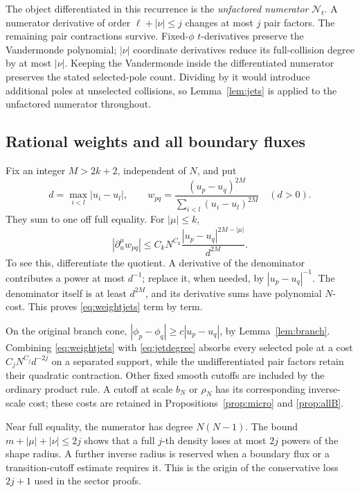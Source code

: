 \documentclass[11pt]{article}
\numberwithin{equation}{section}
\theoremstyle{definition}
\begin{document}
The object differentiated in this recurrence is the
\emph{unfactored numerator} \(\mathscr N_t\).
A numerator derivative of order \(\ell+|\nu|\le j\) changes at
most \(j\) pair factors. The remaining pair contractions survive.
Fixed-\(\phi\) \(t\)-derivatives preserve the Vandermonde polynomial;
\(|\nu|\) coordinate derivatives reduce its full-collision degree
by at most \(|\nu|\).
Keeping the Vandermonde inside the differentiated numerator preserves
the stated selected-pole count. Dividing by it would introduce additional
poles at unselected collisions, so Lemma~\ref{lem:jets} is applied
to the unfactored numerator throughout.

\subsection{Rational weights and all boundary fluxes}
Fix an integer \(M>2k+2\), independent of \(N\), and put
\[
 d=\max_{i<l}|u_i-u_l|,\qquad
 w_{pq}=\frac{(u_p-u_q)^{2M}}
                  {\sum_{i<l}(u_i-u_l)^{2M}}\quad(d>0).
\]
They sum to one off full equality. For \(|\mu|\le k\),
\begin{equation}
 |\partial_u^\mu w_{pq}|
 \le C_kN^{C_k}
       \frac{|u_p-u_q|^{2M-|\mu|}}{d^{2M}}.
 \label{eq:weightjets}
\end{equation}
To see this, differentiate the quotient. A derivative of the
denominator contributes a power at most \(d^{-1}\); replace it,
when needed, by \(|u_p-u_q|^{-1}\). The denominator itself is
at least \(d^{2M}\), and its derivative sums have polynomial
\(N\)-cost. This proves \eqref{eq:weightjets} term by term.

On the original branch cone,
\(|\phi_p-\phi_q|\ge c|u_p-u_q|\), by
Lemma~\ref{lem:branch}. Combining \eqref{eq:weightjets} with
\eqref{eq:jetdegree} absorbs every selected pole at a cost
\(C_jN^{C_j}d^{-2j}\) on a separated support, while the
undifferentiated pair factors retain their quadratic contraction.
Other fixed smooth cutoffs are included by the ordinary product
rule. A cutoff at scale \(b_N\) or \(\rho_N\) has its corresponding
inverse-scale cost; these costs are retained in
Propositions~\ref{prop:micro} and \ref{prop:allB}.

Near full equality, the numerator has degree \(N(N-1)\).
The bound \(m+|\mu|+|\nu|\le2j\) shows that a full \(j\)-th
density loses at most \(2j\) powers of the shape radius.
A further inverse radius is reserved when a boundary flux or
a transition-cutoff estimate requires it. This is the origin
of the conservative loss \(2j+1\) used in the sector proofs.
\end{document}
